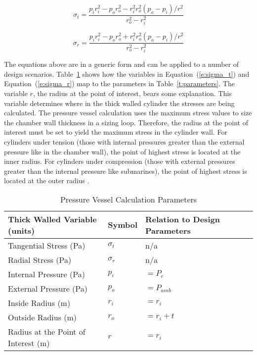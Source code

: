 \documentclass{article}
\begin{document}
\begin{equation}
 \label{e:sigma_t}
  \sigma_t = \frac{p_i r_i^2 - p_o r_o^2 - r_i^2 r_o^2 (p_o - p_i)/r^2}{r_o^2 - r_i^2}
\end{equation}

\begin{equation}
 \label{e:sigma_r}
  \sigma_r = \frac{p_i r_i^2 - p_o r_o^2 + r_i^2 r_o^2 (p_o - p_i)/r^2}{r_o^2 - r_i^2}
\end{equation}

The equations above are in a generic form and can be applied to a number of design scenarios.  Table~\ref{t:parameter_mapping} shows how the variables in Equation~(\ref{e:sigma_t}) and Equation~(\ref{e:sigma_r}) map to the parameters in Table~\ref{t:parameters}.  The variable $r$, the radius at the point of interest, bears some explanation.  This variable determines where in the thick walled cylinder the stresses are being calculated.  The pressure vessel calculation uses the maximum stress values to size the chamber wall thickness in a sizing loop.  Therefore, the radius at the point of interest must be set to yield the maximum stress in the cylinder wall.  For cylinders under tension (those with internal pressures greater than the external pressure like in the chamber wall), the point of highest stress is located at the inner radius.  For cylinders under compression (those with external pressures greater than the internal pressure like submarines), the point of highest stress is located at the outer radius \cite{Kharagpur2015}. 

\begin{table}[ht!]%
  \caption{Pressure Vessel Calculation Parameters}
  \centering
  \begin{tabular}{llll}
   Thick Walled Variable (units) & Symbol & Relation to Design Parameters \\
	\hline\hline
	Tangential Stress (Pa) & $\sigma_t$ & n/a \\
	Radial Stress (Pa) & $\sigma_r$  & n/a \\
	Internal Pressure (Pa) & $p_i$ & $= P_c$\\
	External Pressure (Pa) & $p_o$ & $= P_{amb}$\\
	Inside Radius (m) & $r_i$ & $= r_i$\\
	Outside Radius (m) & $r_o$ & $= r_i + t$\\
	Radius at the Point of Interest (m) & $r$ & $= r_i$\\
	\hline
  \end{tabular}
 \label{t:parameter_mapping}
\end{table}
\end{document}
